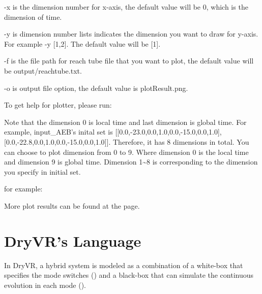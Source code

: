 \documentclass[letterpaper,10pt,english]{sphinxmanual}
\begin{document}
-x is the dimension number for x-axis, the default value will be 0, which is the dimension of time.

-y is dimension number lists indicates the dimension you want to draw for y-axis. For example -y {[}1,2{]}. The default value will be {[}1{]}.

-f is the file path for reach tube file that you want to plot, the default value will be output/reachtube.txt.

-o is output file option, the default value is plotResult.png.

To get help for plotter, please run:

\begin{sphinxVerbatim}[commandchars=\\\{\}]
  
\end{sphinxVerbatim}

Note that the dimension 0 is local time and last dimension is global time. For example, input\_AEB's inital set is {[}{[}0.0,-23.0,0.0,1.0,0.0,-15.0,0.0,1.0{]},{[}0.0,-22.8,0.0,1.0,0.0,-15.0,0.0,1.0{]}{]}. Therefore, it has 8 dimensions in total. You can choose to plot dimension from 0 to 9. Where dimension 0 is the local time and dimension 9 is global time. Dimension 1\textasciitilde{}8 is corresponding to the dimension you specify in initial set.

for example:

\begin{sphinxVerbatim}[commandchars=\\\{\}]
   \PYG{p}{[}\PYG{p}{]}  
\end{sphinxVerbatim}

More plot results can be found at the {\hyperref[\detokenize{example:example-label}]{}} page.


\chapter{DryVR's Language}
\label{\detokenize{dryvr's_language:dryvr-s-language}}\label{\detokenize{dryvr's_language::doc}}
In DryVR,  a hybrid system is modeled as a combination of a white-box that specifies the mode switches ({\hyperref[\detokenize{dryvr's_language:transition-graph-label}]{}}) and a black-box that can simulate the continuous evolution in each mode ({\hyperref[\detokenize{dryvr's_language:black-box-label}]{}}).
\end{document}
